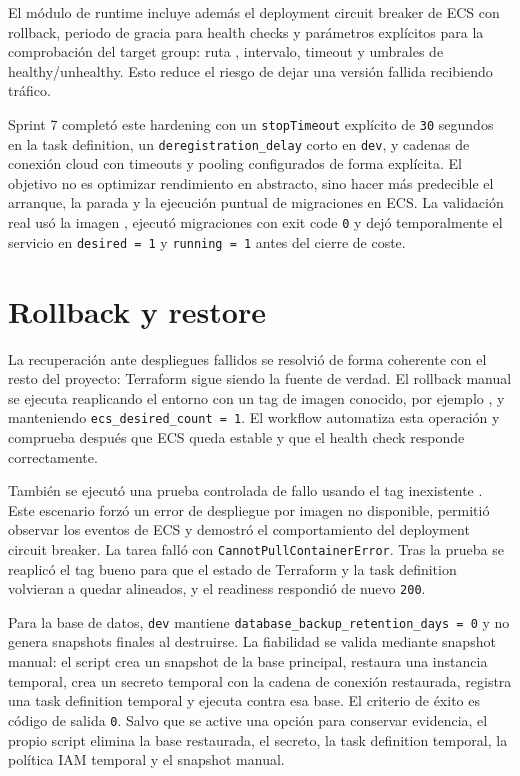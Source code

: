 El módulo de runtime incluye además el deployment circuit breaker de ECS con rollback, periodo de gracia para health checks y parámetros explícitos para la comprobación del target group: ruta , intervalo, timeout y umbrales de healthy/unhealthy. Esto reduce el riesgo de dejar una versión fallida recibiendo tráfico.

Sprint 7 completó este hardening con un \texttt{stopTimeout} explícito de \texttt{30} segundos en la task definition, un \texttt{deregistration\_delay} corto en \texttt{dev}, y cadenas de conexión cloud con timeouts y pooling configurados de forma explícita. El objetivo no es optimizar rendimiento en abstracto, sino hacer más predecible el arranque, la parada y la ejecución puntual de migraciones en ECS. La validación real usó la imagen , ejecutó migraciones con exit code \texttt{0} y dejó temporalmente el servicio en \texttt{desired = 1} y \texttt{running = 1} antes del cierre de coste.

\section{Rollback y restore}
\label{sec:rollback-restore}

La recuperación ante despliegues fallidos se resolvió de forma coherente con el resto del proyecto: Terraform sigue siendo la fuente de verdad. El rollback manual se ejecuta reaplicando el entorno con un tag de imagen conocido, por ejemplo , y manteniendo \texttt{ecs\_desired\_count = 1}. El workflow  automatiza esta operación y comprueba después que ECS queda estable y que el health check responde correctamente.

También se ejecutó una prueba controlada de fallo usando el tag inexistente . Este escenario forzó un error de despliegue por imagen no disponible, permitió observar los eventos de ECS y demostró el comportamiento del deployment circuit breaker. La tarea falló con \texttt{CannotPullContainerError}. Tras la prueba se reaplicó el tag bueno  para que el estado de Terraform y la task definition volvieran a quedar alineados, y el readiness respondió de nuevo \texttt{200}.

Para la base de datos, \texttt{dev} mantiene \texttt{database\_backup\_retention\_days = 0} y no genera snapshots finales al destruirse. La fiabilidad se valida mediante snapshot manual: el script  crea un snapshot de la base principal, restaura una instancia temporal, crea un secreto temporal con la cadena de conexión restaurada, registra una task definition temporal y ejecuta  contra esa base. El criterio de éxito es código de salida \texttt{0}. Salvo que se active una opción para conservar evidencia, el propio script elimina la base restaurada, el secreto, la task definition temporal, la política IAM temporal y el snapshot manual.

